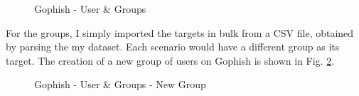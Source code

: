 \documentclass[a4paper]{article}
\begin{document}
\begin{figure}[H]
	\centering
	\caption{Gophish - User \& Groups}
	\label{gop-ug}
\end{figure}

\noindent
For the groups, I simply imported the targets in bulk from a CSV file, obtained by parsing the my dataset. Each scenario would have a different group as its target. The creation of a new group of users on Gophish is shown in Fig. \ref{gop-ugng}.

\begin{figure}[H]
	\centering
	\caption{Gophish - User \& Groups - New Group}
	\label{gop-ugng}
\end{figure}
\end{document}
